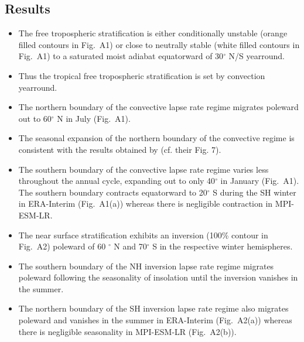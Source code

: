 \documentclass{ametsocV5}
\begin{document}
\subsection{Results}
\begin{itemize}
  \item The free tropospheric stratification is either conditionally unstable (orange filled contours in Fig.~A1) or close to neutrally stable (white filled contours in Fig.~A1) to a saturated moist adiabat equatorward of 30$^{\circ}$ N/S yearround.
  \item Thus the tropical free tropospheric stratification is set by convection yearround.
  \item The northern boundary of the convective lapse rate regime migrates poleward out to 60$^{\circ}$ N in July (Fig.~A1).
  \item The seasonal expansion of the northern boundary of the convective regime is consistent with the results obtained by \cite{stone1979} (cf. their Fig. 7).
  \item The southern boundary of the convective lapse rate regime varies less throughout the annual cycle, expanding out to only 40$^{\circ}$ in January (Fig.~A1). The southern boundary contracts equatorward to 20$^{\circ}$ S during the SH winter in ERA-Interim (Fig.~A1(a)) whereas there is negligible contraction in MPI-ESM-LR.
  \item The near surface stratification exhibits an inversion (100\% contour in Fig.~A2) poleward of 60 $^{\circ}$ N and 70$^{\circ}$ S in the respective winter hemispheres.
  \item The southern boundary of the NH inversion lapse rate regime migrates poleward following the seasonality of insolation until the inversion vanishes in the summer.
  \item The northern boundary of the SH inversion lapse rate regime also migrates poleward and vanishes in the summer in ERA-Interim (Fig.~A2(a)) whereas there is negligible seasonality in MPI-ESM-LR (Fig.~A2(b)).
\end{itemize}
\end{document}
